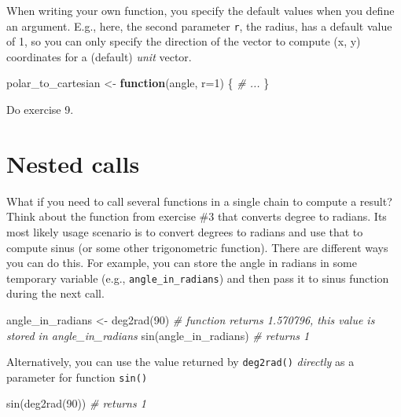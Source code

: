 \documentclass[
]{book}
\newenvironment{Shaded}{\begin{snugshade}}{\end{snugshade}}
\newcommand{\AttributeTok}[1]{\textcolor[rgb]{0.77,0.63,0.00}{#1}}
\newcommand{\CommentTok}[1]{\textcolor[rgb]{0.56,0.35,0.01}{\textit{#1}}}
\newcommand{\ControlFlowTok}[1]{\textcolor[rgb]{0.13,0.29,0.53}{\textbf{#1}}}
\newcommand{\DecValTok}[1]{\textcolor[rgb]{0.00,0.00,0.81}{#1}}
\newcommand{\FunctionTok}[1]{\textcolor[rgb]{0.00,0.00,0.00}{#1}}
\newcommand{\NormalTok}[1]{#1}
\newcommand{\OtherTok}[1]{\textcolor[rgb]{0.56,0.35,0.01}{#1}}
\begin{document}
When writing your own function, you specify the default values when you define an argument. E.g., here, the second parameter \texttt{r}, the radius, has a default value of 1, so you can only specify the direction of the vector to compute (x, y) coordinates for a (default) \emph{unit} vector.

\begin{Shaded}
\begin{Highlighting}[]
\NormalTok{polar\_to\_cartesian }\OtherTok{\textless{}{-}} \ControlFlowTok{function}\NormalTok{(angle, }\AttributeTok{r=}\DecValTok{1}\NormalTok{) \{}
  \CommentTok{\# ...}
\NormalTok{\}}
\end{Highlighting}
\end{Shaded}

Do exercise 9.

\hypertarget{nested-calls}{%
\section{Nested calls}\label{nested-calls}}

What if you need to call several functions in a single chain to compute a result? Think about the function from exercise \#3 that converts degree to radians. Its most likely usage scenario is to convert degrees to radians and use that to compute sinus (or some other trigonometric function). There are different ways you can do this. For example, you can store the angle in radians in some temporary variable (e.g., \texttt{angle\_in\_radians}) and then pass it to sinus function during the next call.

\begin{Shaded}
\begin{Highlighting}[]
\NormalTok{angle\_in\_radians }\OtherTok{\textless{}{-}} \FunctionTok{deg2rad}\NormalTok{(}\DecValTok{90}\NormalTok{) }\CommentTok{\# function returns 1.570796, this value is stored in angle\_in\_radians}
\FunctionTok{sin}\NormalTok{(angle\_in\_radians) }\CommentTok{\# returns 1}
\end{Highlighting}
\end{Shaded}

Alternatively, you can use the value returned by \texttt{deg2rad()} \emph{directly} as a parameter for function \texttt{sin()}

\begin{Shaded}
\begin{Highlighting}[]
\FunctionTok{sin}\NormalTok{(}\FunctionTok{deg2rad}\NormalTok{(}\DecValTok{90}\NormalTok{)) }\CommentTok{\# returns 1}
\end{Highlighting}
\end{Shaded}
\end{document}

